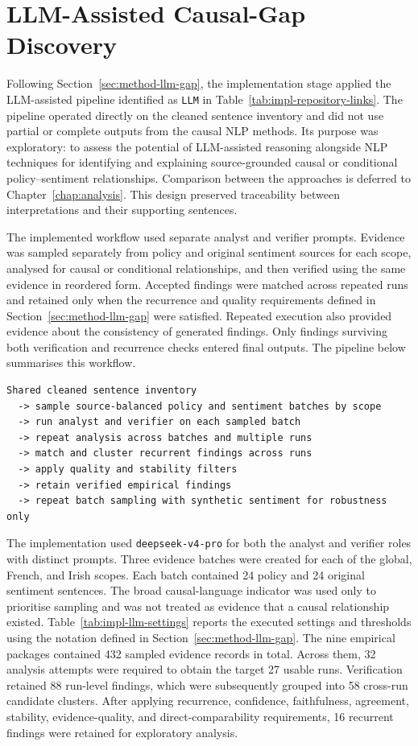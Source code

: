 \section{LLM-Assisted Causal-Gap Discovery}
\label{sec:impl-llm-causal-gap}

Following Section~\ref{sec:method-llm-gap}, the implementation stage applied the
LLM-assisted pipeline identified as \texttt{LLM} in
Table~\ref{tab:impl-repository-links}. The pipeline operated directly on the cleaned
sentence inventory and did not use partial or complete outputs from the causal NLP
methods. Its purpose was exploratory: to assess the potential of LLM-assisted
reasoning alongside NLP techniques for identifying and explaining source-grounded
causal or conditional policy--sentiment relationships. Comparison between the
approaches is deferred to Chapter~\ref{chap:analysis}. This design preserved
traceability between interpretations and their supporting sentences.

The implemented workflow used separate analyst and verifier prompts. Evidence was
sampled separately from policy and original sentiment sources for each scope,
analysed for causal or conditional relationships, and then verified using the same
evidence in reordered form. Accepted findings were matched across repeated runs and
retained only when the recurrence and quality requirements defined in
Section~\ref{sec:method-llm-gap} were satisfied. Repeated execution also provided
evidence about the consistency of generated findings. Only findings surviving both
verification and recurrence checks entered final outputs. The pipeline below
summarises this workflow.

{\small
\begin{verbatim}
Shared cleaned sentence inventory
  -> sample source-balanced policy and sentiment batches by scope
  -> run analyst and verifier on each sampled batch
  -> repeat analysis across batches and multiple runs
  -> match and cluster recurrent findings across runs
  -> apply quality and stability filters
  -> retain verified empirical findings
  -> repeat batch sampling with synthetic sentiment for robustness only
\end{verbatim}
}


The implementation used \texttt{deepseek-v4-pro} for both the analyst and verifier
roles with distinct prompts. Three evidence batches were created for each of the
global, French, and Irish scopes. Each batch contained 24 policy and 24 original
sentiment sentences. The broad causal-language indicator was used only to prioritise
sampling and was not treated as evidence that a causal relationship existed.
Table~\ref{tab:impl-llm-settings} reports the executed settings and thresholds using
the notation defined in Section~\ref{sec:method-llm-gap}. The nine empirical packages
contained 432 sampled evidence records in total. Across them, 32 analysis attempts
were required to obtain the target 27 usable runs. Verification retained 88 run-level
findings, which were subsequently grouped into 58 cross-run candidate clusters. After
applying recurrence, confidence, faithfulness, agreement, stability,
evidence-quality, and direct-comparability requirements, 16 recurrent findings were
retained for exploratory analysis.


